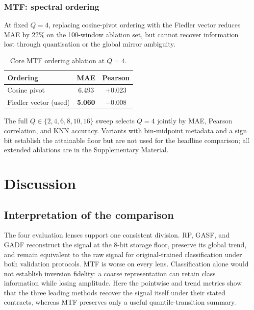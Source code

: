 \documentclass[10pt,a4paper,parskip=half-]{scrartcl}
\begin{document}
\subsubsection{MTF: spectral ordering}
\label{sec:mtf_ablation}

At fixed \(Q=4\), replacing cosine-pivot ordering with the Fiedler vector reduces MAE by 22\% on the 100-window ablation set, but cannot recover information lost through quantisation or the global mirror ambiguity.

\begin{table}[!htbp]
\centering
\caption{Core MTF ordering ablation at \(Q=4\).}
\label{tab:mtf_ablation}

\begin{tabular}{lcc}
\toprule
Ordering & MAE & Pearson \\
\midrule
Cosine pivot & 6.493 & \(+0.023\) \\
Fiedler vector (used) & \textbf{5.060} & \(-0.008\) \\
\bottomrule
\end{tabular}
\end{table}

The full \(Q\in\{2,4,6,8,10,16\}\) sweep selects \(Q=4\) jointly by MAE, Pearson correlation, and KNN accuracy. Variants with bin-midpoint metadata and a sign bit establish the attainable floor but are not used for the headline comparison; all extended ablations are in the Supplementary Material.

\section{Discussion}
\label{sec:discussion}

\subsection{Interpretation of the comparison}
\label{sec:disc_pointwise}
\label{sec:disc_classification}
\label{sec:disc_convergence}

The four evaluation lenses support one consistent division. RP, GASF, and GADF reconstruct the signal at the 8-bit storage floor, preserve its global trend, and remain equivalent to the raw signal for original-trained classification under both validation protocols. MTF is worse on every lens. Classification alone would not establish inversion fidelity: a coarse representation can retain class information while losing amplitude. Here the pointwise and trend metrics show that the three leading methods recover the signal itself under their stated contracts, whereas MTF preserves only a useful quantile-transition summary.
\end{document}
